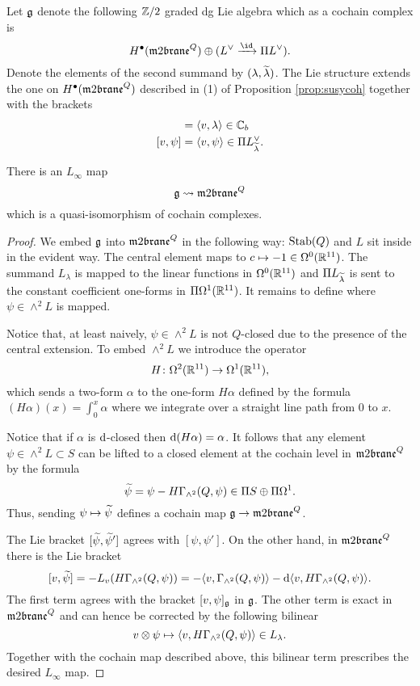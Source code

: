\begin{lem}
\label{lem:gmodel}
Let $\fg$ denote the following $\ZZ/2$ graded dg Lie algebra which as a cochain complex is
\[
H^\bu(\m2^Q) \oplus (L^\vee \xto{\id} \Pi L^\vee)  .
\]
Denote the elements of the second summand by $(\lambda, \til\lambda)$. 
The Lie structure extends the one on $H^\bu(\m2^Q)$ described in (1) of Proposition \ref{prop:susycoh} together with the brackets
\begin{align*}
[v,\lambda] & = \<v, \lambda\> \in \CC_b \\ 
[v,\psi] & = \<v, \psi\> \in \Pi L^\vee_{\Tilde{\lambda}}.
\end{align*}

There is an $L_\infty$ map 
\[
\fg \rightsquigarrow \m2^Q
\] 
which is a quasi-isomorphism of cochain complexes.  
\end{lem}
\begin{proof}
We embed $\fg$ into $\m2^Q$ in the following way: ${\rm Stab}(Q)$ and $L$ sit inside in the evident way.
The central element maps to $c \mapsto - 1 \in \Omega^0(\RR^{11})$.
The summand $L_\lambda$ is mapped to the linear functions in $\Omega^0(\RR^{11})$ and $\Pi L_{\Tilde{\lambda}}$ is sent to the constant coefficient one-forms in $\Pi \Omega^1(\RR^{11})$. 
It remains to define where $\psi \in \wedge^2 L$ is mapped.

Notice that, at least naively, $\psi \in \wedge^2 L$ is not $Q$-closed due to the presence of the central extension. 
To embed $\wedge^2 L$ we introduce the operator
\[
H \colon \Omega^2 (\RR^{11}) \to \Omega^1(\RR^{11}),
\]
which sends a two-form $\alpha$ to the one-form $H \alpha$ defined by the formula $(H \alpha) (x) = \int_0^x \alpha$
where we integrate over a straight line path from $0$ to $x$.

Notice that if $\alpha$ is $\d$-closed then $\d (H \alpha) = \alpha$. 
It follows that any element $\psi \in \wedge^2 L \subset S$ can be lifted to a closed element at the cochain level in $\m2^Q$ by the formula
\[
\Tilde{\psi} = \psi - H \Gamma_{\wedge^2} (Q, \psi) \in \Pi S \oplus \Pi \Omega^1 .
\]
Thus, sending $\psi \mapsto \Tilde{\psi}$ defines a cochain map $\fg \to \m2^Q$. 

The Lie bracket $[\Tilde{\psi}, \Tilde{\psi}']$ agrees with $[\psi, \psi']$. 
On the other hand, in $\m2^Q$ there is the Lie bracket 
\[
[v,\Tilde{\psi}] = - L_v (H \Gamma_{\wedge^2} (Q, \psi)) = -\<v, \Gamma_{\wedge^2}(Q, \psi)\> - \d \<v, H \Gamma_{\wedge^2}(Q, \psi)\> .
\]
The first term agrees with the bracket $[v, \psi]_{\fg}$ in $\fg$. 
The other term is exact in $\m2^Q$ and can hence be corrected by the following bilinear  
\[
v \otimes \psi \mapsto \<v, H \Gamma_{\wedge^2} (Q,\psi) \> \in L_\lambda .
\] 
Together with the cochain map described above, this bilinear term prescribes the desired $L_\infty$ map. 

\end{proof}

